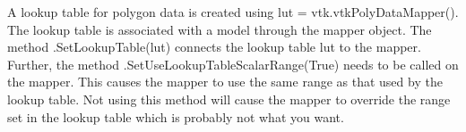 \documentclass{article}
\begin{document}
A lookup table for polygon data is created using lut = vtk.vtkPolyDataMapper(). The lookup table is associated with a model through the mapper object. The method .SetLookupTable(lut) connects the lookup table lut to the mapper. Further, the method .SetUseLookupTableScalarRange(True) needs to be called on the mapper. This causes the mapper to use the same range as that used by the lookup table. Not using this method will cause the mapper to override the range set in the lookup table which is probably not what you want.



\end{document}
